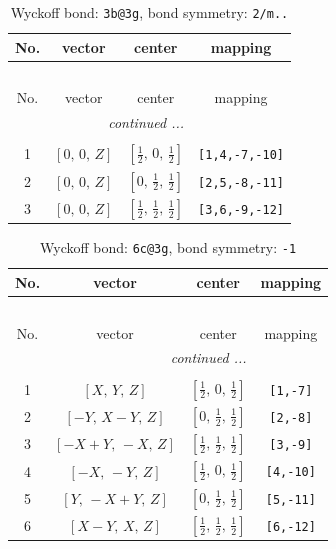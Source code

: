 \documentclass[fleqn,8pt]{jsarticle}
\begin{document}
\renewcommand{\arraystretch}{1.2}
\begin{longtable}{cccc}
\caption{Wyckoff bond: {\tt 3b@3g}, bond symmetry: {\tt 2/m..}}
 \\
 \hline \hline
No. & vector & center & mapping \\ \hline \endfirsthead

\multicolumn{3}{l}{\tablename\ \thetable{}} \\
 \hline \hline
No. & vector & center & mapping \\ \hline \endhead

 \hline \hline
\multicolumn{3}{r}{\footnotesize\it continued ...} \\ \endfoot

 \hline \hline
\multicolumn{3}{r}{} \\ \endlastfoot

1 & $\left[ 0,\, 0,\, Z \right]$ & $\left[ \frac{1}{2},\, 0,\, \frac{1}{2} \right]$ & {\tt [1,4,-7,-10]} \\ \hline
2 & $\left[ 0,\, 0,\, Z \right]$ & $\left[ 0,\, \frac{1}{2},\, \frac{1}{2} \right]$ & {\tt [2,5,-8,-11]} \\ \hline
3 & $\left[ 0,\, 0,\, Z \right]$ & $\left[ \frac{1}{2},\, \frac{1}{2},\, \frac{1}{2} \right]$ & {\tt [3,6,-9,-12]} \\
\end{longtable}
\renewcommand{\arraystretch}{1.2}
\begin{longtable}{cccc}
\caption{Wyckoff bond: {\tt 6c@3g}, bond symmetry: {\tt -1}}
 \\
 \hline \hline
No. & vector & center & mapping \\ \hline \endfirsthead

\multicolumn{3}{l}{\tablename\ \thetable{}} \\
 \hline \hline
No. & vector & center & mapping \\ \hline \endhead

 \hline \hline
\multicolumn{3}{r}{\footnotesize\it continued ...} \\ \endfoot

 \hline \hline
\multicolumn{3}{r}{} \\ \endlastfoot

1 & $\left[ X,\, Y,\, Z \right]$ & $\left[ \frac{1}{2},\, 0,\, \frac{1}{2} \right]$ & {\tt [1,-7]} \\ \hline
2 & $\left[ - Y,\, X - Y,\, Z \right]$ & $\left[ 0,\, \frac{1}{2},\, \frac{1}{2} \right]$ & {\tt [2,-8]} \\ \hline
3 & $\left[ - X + Y,\, - X,\, Z \right]$ & $\left[ \frac{1}{2},\, \frac{1}{2},\, \frac{1}{2} \right]$ & {\tt [3,-9]} \\ \hline
4 & $\left[ - X,\, - Y,\, Z \right]$ & $\left[ \frac{1}{2},\, 0,\, \frac{1}{2} \right]$ & {\tt [4,-10]} \\ \hline
5 & $\left[ Y,\, - X + Y,\, Z \right]$ & $\left[ 0,\, \frac{1}{2},\, \frac{1}{2} \right]$ & {\tt [5,-11]} \\ \hline
6 & $\left[ X - Y,\, X,\, Z \right]$ & $\left[ \frac{1}{2},\, \frac{1}{2},\, \frac{1}{2} \right]$ & {\tt [6,-12]} \\
\end{longtable}
\end{document}
